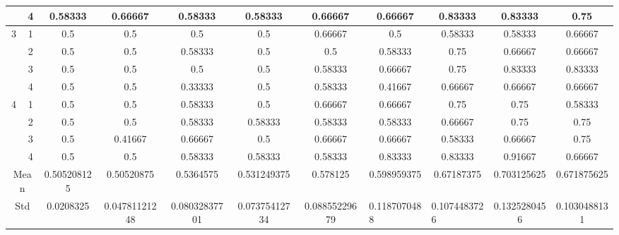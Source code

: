 \documentclass[draft,dvipsnames]{drexel-thesis}
\begin{document}
\begin{thesis}
\begin{table}[!t]
{\begin{tabular}{|c|c|c|c|c|c|c|c|c|c|c|}
                      & 4                   & 0.58333     & 0.66667       & 0.58333       & 0.58333       & 0.66667       & 0.66667                           & 0.83333                           & 0.83333      & 0.75         \\ \hline
\multirow{4}{*}{3}    & 1                   & 0.5         & 0.5           & 0.5           & 0.5           & 0.66667       & 0.5                               & 0.58333                           & 0.58333      & 0.66667      \\ \cline{2-11} 
                      & 2                   & 0.5         & 0.5           & 0.58333       & 0.5           & 0.5           & 0.58333                           & 0.75                              & 0.66667      & 0.66667      \\ \cline{2-11} 
                      & 3                   & 0.5         & 0.5           & 0.5           & 0.5           & 0.58333       & 0.66667                           & 0.75                              & 0.83333      & 0.83333      \\ \cline{2-11} 
                      & 4                   & 0.5         & 0.5           & 0.33333       & 0.5           & 0.58333       & 0.41667                           & 0.66667                           & 0.66667      & 0.66667      \\ \hline
\multirow{4}{*}{4}    & 1                   & 0.5         & 0.5           & 0.58333       & 0.5           & 0.66667       & 0.66667                           & 0.75                              & 0.75         & 0.58333      \\ \cline{2-11} 
                      & 2                   & 0.5         & 0.5           & 0.58333       & 0.58333       & 0.58333       & 0.58333                           & 0.66667                           & 0.75         & 0.75         \\ \cline{2-11} 
                      & 3                   & 0.5         & 0.41667       & 0.66667       & 0.5           & 0.66667       & 0.66667                           & 0.58333                           & 0.66667      & 0.75         \\ \cline{2-11} 
                      & 4                   & 0.5         & 0.5           & 0.58333       & 0.58333       & 0.58333       & 0.83333                           & 0.83333                           & 0.91667      & 0.66667      \\ \hline
\multicolumn{2}{|c|}{Mean}                  & 0.505208125 & 0.50520875    & 0.5364575     & 0.531249375   & 0.578125      & 0.598959375                       & 0.67187375                        & 0.703125625  & 0.671875625  \\ \hline
\multicolumn{2}{|c|}{Std}                   & 0.0208325   & 0.04781121248 & 0.08032837701 & 0.07375412734 & 0.08855229679 & \multicolumn{1}{l|}{0.1187070488} & \multicolumn{1}{l|}{0.1074483726} & 0.1325280456 & 0.1030488131 \\ \hline
\end{tabular}}
\end{table}


\end{thesis}
\end{document}
